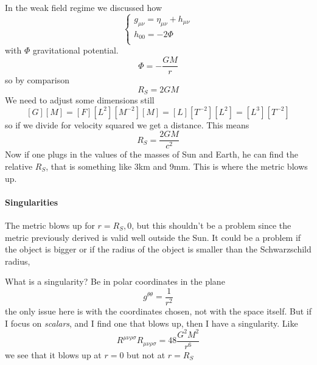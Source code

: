 In the weak field regime we discussed how
\begin{equation}
\begin{cases}
g_{\mu \nu } = \eta _{\mu \nu } + h_{\mu \nu } \\
h_{00} = -2\Phi  \\
\end{cases}
\end{equation}
with $\Phi $ gravitational potential. 
\[
\Phi  =  - \frac{GM}{r}
\]
so by comparison
\[
R_{S} = 2GM
\]
We need to adjust some dimensions still
\[
\left[ G \right] \left[ M \right] = \left[ F \right]\left[ L^{2} \right]\left[ M^{-2} \right]\left[ M \right] = \left[ L \right]\left[ T^{-2} \right]\left[ L^{2} \right] = \left[ L^{3} \right]\left[ T^{-2} \right] 
\]
so if we divide for velocity squared we get a distance. This means
\[
R_{S } = \frac{2GM}{c^{2}}
\]
Now if one plugs in the values of the masses of Sun and Earth, he can find the relative $R_{S}$, that is something like 3km and 9mm. This is where the metric blows up.\par

\paragraph{Singularities}
The metric blows up for $r = R_{S}, 0$, but this shouldn't be a problem since the metric previously derived is valid well outside the Sun. It could be a problem if the object is bigger or if the radius of the object is smaller than the Schwarzschild radius,\par
What is a singularity?  Be in polar coordinates in the plane
\[
g^{\theta \theta } = \frac{1}{r^{2}}
\]
the only issue here is with the coordinates chosen, not with the space itself. But if I focus on \emph{scalars}, and I find one that blows up, then I have a singularity. Like
\[
R^{\mu \nu \rho \sigma }R_{\mu \nu \rho \sigma } = 48 \frac{G^{2}M^{2}}{r^{6}}
\]
we see that it blows up at $r=0$ but not at $r = R_{S}$





















